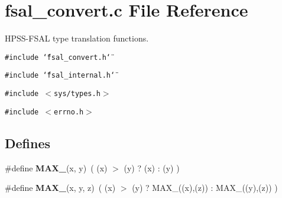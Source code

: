 \section{fsal\_\-convert.c File Reference}
\label{fsal__convert_8c}
HPSS-FSAL type translation functions. 

{\tt \#include \char`\"{}fsal\_\-convert.h\char`\"{}}\par
{\tt \#include \char`\"{}fsal\_\-internal.h\char`\"{}}\par
{\tt \#include $<$sys/types.h$>$}\par
{\tt \#include $<$errno.h$>$}\par
\subsection*{Defines}
\begin{CompactItemize}
\item 
\#define {\bf MAX\_}(x, y)\ ( (x) $>$ (y) ? (x) : (y) )\label{fsal__convert_8c_a0}

\item 
\#define {\bf MAX\_}(x, y, z)\ ( (x) $>$ (y) ? MAX\_((x),(z)) : MAX\_((y),(z)) )\label{fsal__convert_8c_a1}

\end{CompactItemize}
